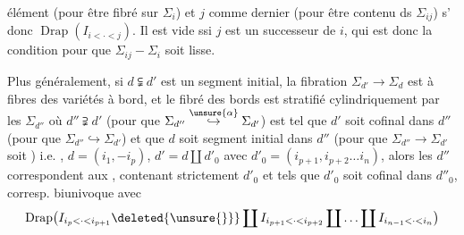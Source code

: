 élément (pour être fibré sur $\Sigma_i$) et $j$ comme dernier (pour être contenu ds $\Sigma_{ij}$) s' donc \inserted{$\simeq$} $\operatorname{Drap}(I_{i<\cdot<j})$. Il est vide ssi $j$ est un successeur de $i$, qui est donc la condition pour que $\Sigma_{ij}-\Sigma_i$ soit lisse.

Plus généralement, si $d\subsetneqq d'$ est un segment initial, la fibration $\Sigma_{d'}\longrightarrow\Sigma_d$ est à fibres des variétés à bord, et le fibré des bords est stratifié cylindriquement par les $\Sigma_{d''}$ où $d''\supsetneqq d'$ (pour que $\Sigma_{d''}\overset{\unsure{\alpha}}{\hookrightarrow}\Sigma_{d'}$) est tel que $d'$ soit cofinal dans $d''$ (pour que $\Sigma_{d''}\hookrightarrow\Sigma_{d'}$) et que $d$ soit segment initial dans $d''$ (pour que $\Sigma_{d''}\longrightarrow\Sigma_{d'}$ soit ) i.e.  , $d=(i_1,-i_p)$,  $d'=d\coprod d'_0$  avec $d'_0=(i_{p+1},i_{p+2}\ldots i_n)$, alors les $d''$ correspondent aux
, contenant  strictement $d'_0$ et tels que $d'_0$ soit cofinal dans $d''_0$,   corresp. biunivoque avec
\[
\operatorname{Drap}\bigl(I_{i_p<\cdot<i_{p+1}}\deleted{\unsure{\}}}\coprod I_{i_{p+1}<\cdot<i_{p+2}}\coprod\ldots\coprod I_{i_{n-1}<\cdot<i_n}\bigr)
\]
